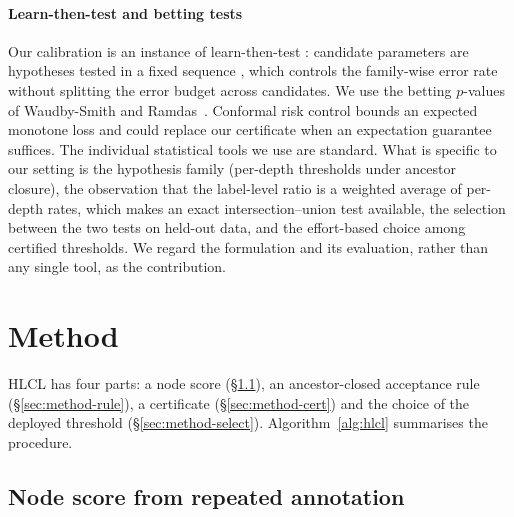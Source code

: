 \documentclass[preprint,12pt]{elsarticle}
\theoremstyle{definition}
\theoremstyle{remark}
\newcommand{\hlcl}{\textup{\textsc{HLCL}}}
\begin{document}
\paragraph{Learn-then-test and betting tests}
Our calibration is an instance of learn-then-test \cite{angelopoulos2025learnthen}:
candidate parameters are hypotheses tested in a fixed sequence
\cite{bauer1991multiple}, which controls the family-wise error rate without
splitting the error budget across candidates. We use the betting $p$-values of
Waudby-Smith and Ramdas~\cite{waudbysmith2024estimating}. Conformal risk control
\cite{angelopoulos2024conformal} bounds an expected monotone loss and could
replace our certificate when an expectation guarantee suffices. The individual
statistical tools we use are standard. What is specific to our setting is the
hypothesis family (per-depth thresholds under ancestor closure), the observation
that the label-level ratio is a weighted average of per-depth rates, which makes
an exact intersection--union test available, the selection between the two tests
on held-out data, and the effort-based choice among certified thresholds. We
regard the formulation and its evaluation, rather than any single tool, as the
contribution.

\section{Method}
\label{sec:method}

\hlcl{} has four parts: a node score (\S\ref{sec:method-score}), an
ancestor-closed acceptance rule (\S\ref{sec:method-rule}), a certificate
(\S\ref{sec:method-cert}) and the choice of the deployed threshold
(\S\ref{sec:method-select}). Algorithm~\ref{alg:hlcl} summarises the procedure.

\subsection{Node score from repeated annotation}
\label{sec:method-score}
\end{document}

